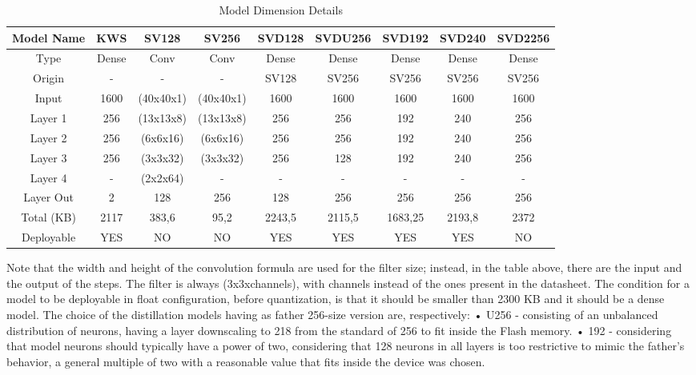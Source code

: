 \begin{table}[!h]
    \label{tabel:model sizes}
\centering
    \begin{tabular}{|c|c|c|c|c|c|c|c|c|}
        \hline
        Model Name & KWS & SV128 & SV256 & SVD128 & SVDU256 & SVD192 & SVD240 & SVD2256\\
        \hline
        Type & Dense & Conv & Conv & Dense & Dense & Dense & Dense & Dense\\
        Origin & - & - &  - & SV128 & SV256 & SV256 & SV256 & SV256\\
        Input & 1600 & (40x40x1) & (40x40x1) & 1600 & 1600 & 1600 & 1600 & 1600\\
        Layer 1 & 256 & (13x13x8) & (13x13x8) & 256 & 256 & 192 & 240 & 256\\
        Layer 2 & 256 & (6x6x16) & (6x6x16) & 256 & 256 & 192 & 240 & 256\\
        Layer 3 & 256 & (3x3x32) & (3x3x32) & 256 & 128 & 192 & 240 & 256\\
        Layer 4 & - & (2x2x64) & - & - & - & - & - & -\\
        Layer Out & 2 & 128 & 256 & 128 & 256 & 256 & 256 & 256\\
        Total (KB) & 2117 & 383,6 & 95,2 & 2243,5 & 2115,5 & 1683,25 & 2193,8 & 2372\\
        Deployable & YES & NO & NO & YES & YES & YES & YES & NO\\
        \hline
    \end{tabular}
    \label{table:model dimension}
    \caption{Model Dimension Details}
\end{table}
Note that the width and height of the convolution formula are used for the filter size; instead, in the table above, there are the input and the output of the steps. The filter is always (3x3xchannels), with channels instead of the ones present in the datasheet. The condition for a model to be deployable in float configuration, before quantization, is that it should be smaller than 2300 KB and it should be a dense model. The choice of the distillation models having as father 256-size version are, respectively:\newline
• U256 - consisting of an unbalanced distribution of neurons, having a layer downscaling to 218 from the standard of 256 to fit inside the Flash memory.\newline
• 192 - considering that model neurons should typically have a power of two, considering that 128 neurons in all layers is too restrictive to mimic the father's behavior, a general multiple of two with a reasonable value that fits inside the device was chosen.\newline
